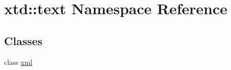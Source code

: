 \hypertarget{namespacextd_1_1text}{}\section{xtd\+:\+:text Namespace Reference}
\label{namespacextd_1_1text}
\subsection*{Classes}
\begin{DoxyCompactItemize}
\item 
class \hyperlink{classxtd_1_1text_1_1xml}{xml}
\end{DoxyCompactItemize}
